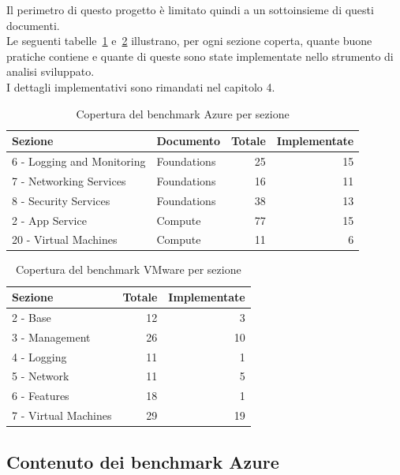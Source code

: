 \documentclass[a4paper,11pt]{report}
\begin{document}
Il perimetro di questo progetto è limitato quindi a un sottoinsieme di questi documenti.\\
Le seguenti tabelle~\ref{tab:sez-az} e~\ref{tab:sez-vmw} illustrano, per ogni sezione coperta, quante buone pratiche contiene e quante di queste sono state implementate nello strumento di analisi sviluppato.\\
I dettagli implementativi sono rimandati nel capitolo 4.

\begin{table}[H]
\centering
\small
\begin{tabular}{llrr}
\hline
\textbf{Sezione} & \textbf{Documento} & \textbf{Totale} & \textbf{Implementate} \\
\hline
6 - Logging and Monitoring & Foundations & 25 & 15 \\
7 - Networking Services    & Foundations & 16 & 11 \\
8 - Security Services      & Foundations & 38 & 13 \\
2 - App Service            & Compute     & 77 & 15 \\
20 - Virtual Machines      & Compute     & 11 &  6 \\
\hline
\end{tabular}
\caption{Copertura del benchmark Azure per sezione}
\label{tab:sez-az}
\end{table}

\begin{table}[H]
\centering
\small
\begin{tabular}{lrr}
\hline
\textbf{Sezione} & \textbf{Totale} & \textbf{Implementate} \\
\hline
2 - Base             & 12 &  3 \\
3 - Management       & 26 & 10 \\
4 - Logging          & 11 &  1 \\
5 - Network          & 11 &  5 \\
6 - Features         & 18 &  1 \\
7 - Virtual Machines & 29 & 19 \\
\hline
\end{tabular}
\caption{Copertura del benchmark VMware per sezione}
\label{tab:sez-vmw}
\end{table}

\subsection{Contenuto dei benchmark Azure}
\end{document}
